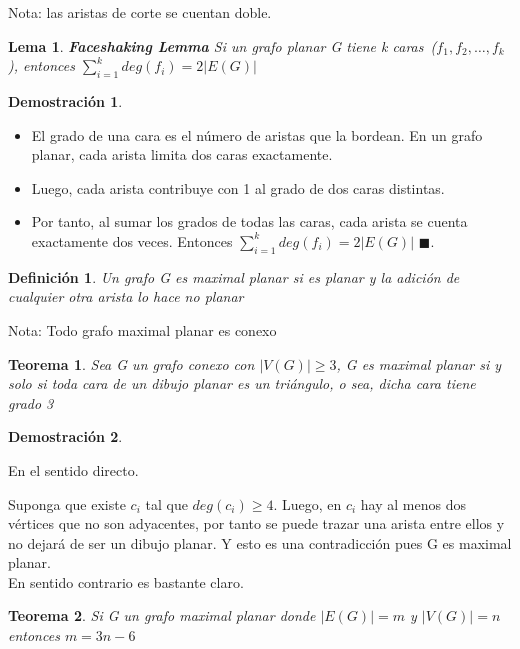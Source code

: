 \documentclass[a4paper,1pt]{report}
\newtheorem*{teo}{Teorema}
\newtheorem*{dem}{Demostración}
\newtheorem*{dfn}{Definición}
\newtheorem*{lem}{Lema}
\begin{document}
Nota: las aristas de corte se cuentan doble.

\begin{lem} \textbf{Faceshaking Lemma}
 Si un grafo planar G tiene k caras~($f_1,f_2,\dots,f_k$), entonces $\sum^k_{i=1}deg(f_i)=2|E(G)|$
\end{lem}

\begin{dem}
 
\end{dem}

\begin{itemize}
 \item El grado de una cara es el número de aristas que la bordean. En un grafo planar, cada arista limita dos caras exactamente.
 \item Luego, cada arista contribuye con 1 al grado de dos caras distintas.
 \item Por tanto, al sumar los grados de todas las caras, cada arista se cuenta exactamente dos veces. Entonces $\sum^k_{i=1}deg(f_i)=2|E(G)|$ $\blacksquare$.
\end{itemize}


\begin{dfn}
 Un grafo G es maximal planar si es planar y la adición de cualquier otra arista lo hace no planar
\end{dfn}

Nota: Todo grafo maximal planar es conexo

\begin{teo}
 Sea G un grafo conexo con $|V(G)|\geq 3$, G es maximal planar si y solo si toda cara de un dibujo planar es un triángulo, o sea,  dicha cara tiene grado 3
\end{teo}

\begin{dem}
 
\end{dem}

En el sentido directo.

Suponga que existe $c_i$ tal que $deg(c_i)\geq 4$. Luego, en $c_i$ hay al menos dos vértices que no son adyacentes, por tanto se puede trazar una arista entre ellos y no dejará de ser un dibujo planar. Y esto es una contradicción pues G es maximal planar.\\

En sentido contrario es bastante claro.

\begin{teo}
 Si G un grafo maximal planar donde $|E(G)|=m$  y $|V(G)|=n$ entonces $m=3n-6$
\end{teo}
\end{document}
